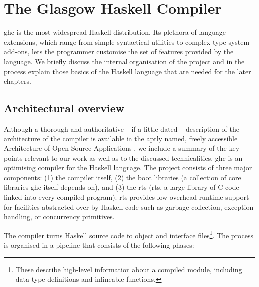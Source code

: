 \documentclass[thesis=B,english]{FITthesis}[2019/12/23]
\begin{document}
\section{The Glasgow Haskell Compiler} \label{sec:ghc}
\acrshort{ghc} is the most widespread Haskell distribution. Its plethora of
language extensions\cite{ghc-language-extensions}, which range from simple
syntactical utilities to complex type system add-ons, lets the programmer
customise the set of features provided by the language. We briefly discuss the
internal organisation of the project and in the process explain those basics of
the Haskell language that are needed for the later chapters.

\subsection{Architectural overview}
Although a thorough and authoritative -- if a little dated -- description of
the architecture of the compiler is available in the aptly named, freely
accessible Architecture of Open Source Applications \cite{arch-ghc}, we include
a summary of the key points relevant to our work as well as to the discussed
technicalities. \acrshort{ghc} is an optimising compiler for the Haskell
language. The project consists of three major components: (1) the compiler
itself, (2) the boot libraries (a collection of core libraries \acrshort{ghc}
itself depends on), and (3) the \acrlong{rts} (\acrshort{rts}, a large library
of C code linked into every compiled program). \acrshort{rts} provides
low-overhead runtime support for facilities abstracted over by Haskell code
such as garbage collection, exception handling, or concurrency primitives.

The compiler turns Haskell source code to object and interface files\footnote{
These describe high-level information about a compiled module, including data
type definitions and in\-line\-able functions.}. The process is organised in
a pipeline that consists of the following phases:
\end{document}
